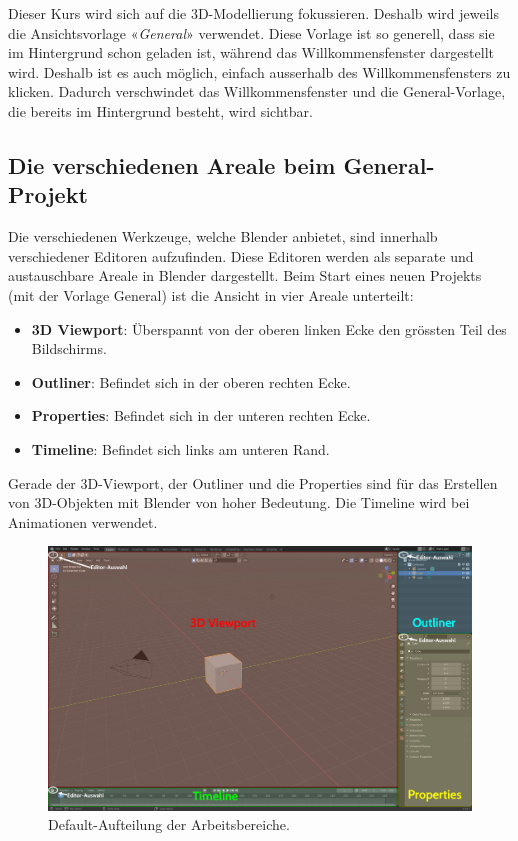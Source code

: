 \documentclass[
]{book}
\providecommand{\tightlist}{%
  \setlength{\itemsep}{0pt}\setlength{\parskip}{0pt}}\usepackage{longtable,booktabs,array}
\let\oldmarginnote\marginnote
\renewcommand{\marginnote}[1]{%
  \oldmarginnote{{\footnotesize\selectfont #1}}%
}
\begin{document}
Dieser Kurs wird sich auf die 3D-Modellierung fokussieren. Deshalb wird
jeweils die Ansichtsvorlage «\emph{General}» verwendet. Diese Vorlage
ist so generell, dass sie im Hintergrund schon geladen ist, während das
Willkommensfenster dargestellt wird. Deshalb ist es auch möglich,
einfach ausserhalb des Willkommensfensters zu klicken. Dadurch
verschwindet das Willkommensfenster und die General-Vorlage, die bereits
im Hintergrund besteht, wird sichtbar.

\subsection{Die verschiedenen Areale beim
General-Projekt}\label{die-verschiedenen-areale-beim-general-projekt}

\marginnote{Default Editoren}

Die verschiedenen Werkzeuge, welche Blender anbietet, sind innerhalb
verschiedener Editoren aufzufinden. Diese Editoren werden als separate
und austauschbare Areale in Blender dargestellt. Beim Start eines neuen
Projekts (mit der Vorlage General) ist die Ansicht in vier Areale
unterteilt:

\begin{itemize}
\tightlist
\item
  \textbf{3D Viewport}: Überspannt von der oberen linken Ecke den
  grössten Teil des Bildschirms.
\item
  \textbf{Outliner}: Befindet sich in der oberen rechten Ecke.
\item
  \textbf{Properties}: Befindet sich in der unteren rechten Ecke.
\item
  \textbf{Timeline}: Befindet sich links am unteren Rand.
\end{itemize}

Gerade der 3D-Viewport, der Outliner und die Properties sind für das
Erstellen von 3D-Objekten mit Blender von hoher Bedeutung. Die Timeline
wird bei Animationen verwendet.

\begin{figure}

\includegraphics{Chapters/Images/Chapter_1/1_2_Default_Areal.jpg}

\caption{\label{fig-1_2}Default-Aufteilung der Arbeitsbereiche.}

\end{figure}%
\end{document}

